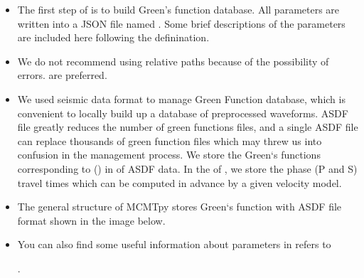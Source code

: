 \documentclass[a4paper,10pt,english,openany]{sphinxmanual}
\begin{document}
\begin{itemize}
\item {} 
The first step of  is to build Green’s function database. All parameters are written into a JSON
file named . Some brief descriptions of the parameters are included here following the
definination.

\item {} 
We do not recommend using relative paths because of the possibility of errors.  are preferred.

\item {} 
We used  seismic data format to manage Green Function database, which is convenient to locally build up
a database of pre\sphinxhyphen{}processed waveforms. ASDF file greatly reduces the number of green functions files,
and a single ASDF file can replace thousands of green function files which may threw us into confusion
in the management process. We store the Green‘s functions corresponding to  ()
in  of ASDF data. In the  of  , we store the phase (P and S) travel times
which can be computed in advance by a given velocity model.

\item {} 
The general structure of MCMTpy stores Green‘s function with ASDF file format shown in the image below.

\end{itemize}

\begin{itemize}
\item {} 
You can also find some useful information about parameters in refers to %
\begin{footnote}[9]\sphinxAtStartFootnote
{}
%
\end{footnote}.

\end{itemize}
\end{document}
